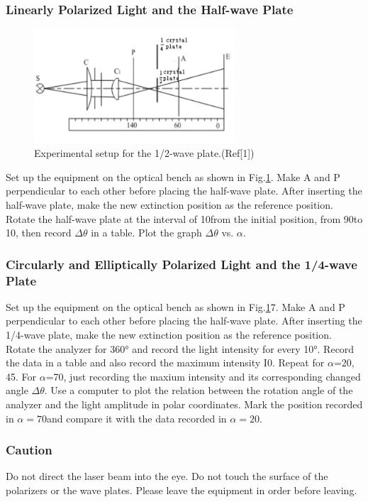 \documentclass[12pt,a4paper]{article}
\begin{document}
\subsubsection{Linearly Polarized Light and the Half-wave Plate}
\begin{figure}[H]
    \centering
    \includegraphics[width=7.5cm]{halfwave.png}
    \caption{Experimental setup for the 1/2-wave plate.(Ref[1])}
    \label{halfwave}
\end{figure}
Set up the equipment on the optical bench as shown in Fig.\ref{halfwave}. Make A and P perpendicular to each other before placing the half-wave plate. After inserting the half-wave plate, make the new extinction position as the reference position. Rotate the half-wave plate at the interval of 10\degree from the initial position, from 90\degree to 10\degree, then record $\Delta\theta$ in a table. Plot the graph $\Delta\theta$ vs. $\alpha$.

\subsubsection{Circularly and Elliptically Polarized Light and the 1/4-wave Plate}
Set up the equipment on the optical bench as shown in Fig.\ref{halfwave}7. Make A and P perpendicular to each other before placing the half-wave plate. After inserting the 1/4-wave plate, make the new extinction position as the reference position. Rotate the analyzer for 360° and record the light intensity for every 10°. Record the data in a table and also record the maximum intensity I0. Repeat for $\alpha$=20\degree, 45\degree. For $\alpha$=70\degree, just recording the maxium intensity and its corresponding changed angle $\Delta\theta$. Use a computer to plot the relation between the rotation angle of the analyzer and the light amplitude in polar coordinates. Mark the position recorded in $\alpha=70$\degree and compare it with the data recorded in $\alpha=20$\degree.

\subsubsection{Caution}
Do not direct the laser beam into the eye.
Do not touch the surface of the polarizers or the wave plates.
Please leave the equipment in order before leaving.
\end{document}
